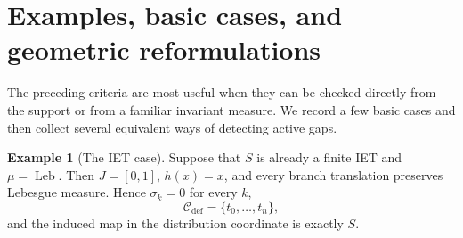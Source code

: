\documentclass[11pt]{amsart}
\theoremstyle{plain}
\theoremstyle{definition}
\newtheorem{example}[theorem]{Example}
\theoremstyle{remark}
\DeclareMathOperator{\Leb}{Leb}
\newcommand{\cC}{\mathcal C}
\begin{document}
\section{Examples, basic cases, and geometric reformulations}

The preceding criteria are most useful when they can be checked directly from the support or
from a familiar invariant measure. We record a few basic cases and then collect several
equivalent ways of detecting active gaps.

\begin{example}[The IET case]\label{ex:iem}
Suppose that \(S\) is already a finite IET and
\(\mu=\Leb\). Then \(J=[0,1]\), \(h(x)=x\), and every branch translation preserves
Lebesgue measure. Hence \(\sigma_k=0\) for every \(k\),
\[
        \cC_{\mathrm{def}}=\{t_0,\ldots,t_n\},
\]
and the induced map in the distribution coordinate is exactly \(S\).
\end{example}
\end{document}
